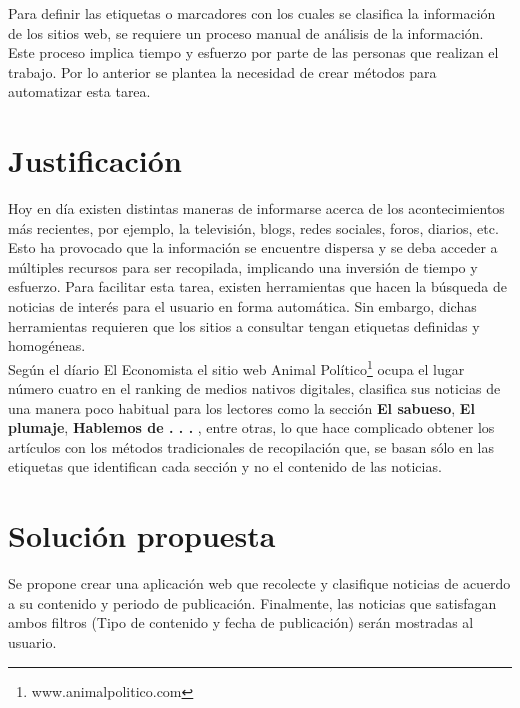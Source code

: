 Para definir las etiquetas o marcadores con los cuales se clasifica la información de los sitios web, se requiere un proceso manual de análisis de 
la información. Este proceso implica tiempo y esfuerzo por parte de las personas que realizan el trabajo. Por lo anterior se plantea la necesidad de crear 
métodos para automatizar esta tarea. 

\section{Justificación}


Hoy en día existen distintas maneras de informarse acerca de los acontecimientos más recientes, por ejemplo, la televisión, blogs, redes sociales, foros,
diarios, etc. Esto ha provocado que la información se encuentre dispersa y
se deba acceder a múltiples recursos para ser recopilada, implicando
una inversión de tiempo y esfuerzo. Para facilitar esta tarea, existen herramientas
que hacen la búsqueda de noticias de interés para el usuario en forma automática. Sin embargo, dichas herramientas requieren que los sitios a consultar 
tengan etiquetas definidas y homogéneas.\\

Según el díario El Economista \citep{CU3} el sitio web Animal Político\footnote{www.animalpolitico.com}
ocupa el lugar número cuatro en el ranking de medios nativos digitales, clasifica sus noticias de una manera poco habitual para los lectores como la sección
\textbf{El sabueso}, \textbf{El plumaje}, \textbf{Hablemos de . . . }, entre otras, lo que hace complicado obtener los artículos con los métodos tradicionales 
de recopilación que, se basan sólo en las etiquetas que identifican cada sección y no el contenido de las noticias.


\section{Solución propuesta}

Se propone crear una aplicación web que recolecte y clasifique noticias de acuerdo a su contenido y periodo de publicación. Finalmente, las noticias
que satisfagan ambos filtros (Tipo de contenido y fecha de publicación) serán mostradas al usuario.


